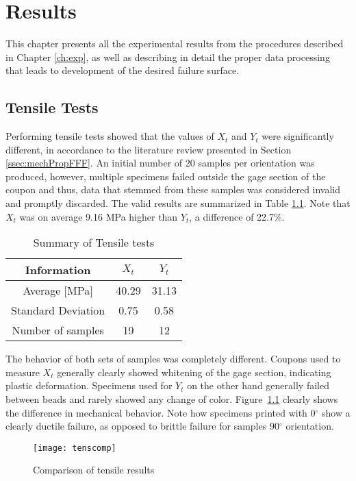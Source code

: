 \documentclass[main.tex]{subfiles}
\begin{document}
\chapter{Results} \label{ch:res}

This chapter presents all the experimental results from the procedures described in Chapter \ref{ch:exp}, as well as describing in detail the proper data processing that leads to development of the desired failure surface.

\section{Tensile Tests} \label{sec:tensr}
Performing tensile tests showed that the values of $X_t$ and $Y_t$ were significantly different, in accordance to the literature review presented in Section \ref{ssec:mechPropFFF}. An initial number of 20 samples per orientation was produced, however, multiple specimens failed outside the gage section of the coupon and thus, data that stemmed from these samples was considered invalid and promptly discarded. The valid results are summarized in Table \ref{tab:tensrtab}. Note that $X_t$ was on average 9.16 MPa higher than $Y_t$, a difference of 22.7\%.
\begin{table} [h]
	\centering
	\caption{Summary of Tensile tests}
\begin{tabular}{ c| c c } 
	\toprule
	\textbf{Information} & $X_t$ & $Y_t$\\
	\midrule
	Average [MPa] & 40.29 & 31.13\\
	Standard Deviation & 0.75 & 0.58\\
	Number of samples & 19 & 12\\
	\bottomrule
\end{tabular}
\label{tab:tensrtab}
\end{table}

The behavior of both sets of samples was completely different. Coupons used to measure $X_t$ generally clearly showed whitening of the gage section, indicating plastic deformation. Specimens used for $Y_t$ on the other hand generally failed between beads and rarely showed any change of color. Figure~\ref{fig:tensComp} clearly shows the difference in mechanical behavior. Note how specimens printed with 0$^\circ$ show a clearly ductile failure, as opposed to brittle failure for samples 90$^\circ$ orientation.

\begin{figure}[h]
	\center
	\texttt{[image: tenscomp]}
	\caption{Comparison of tensile results} \label{fig:tensComp}
\end{figure}
\end{document}
